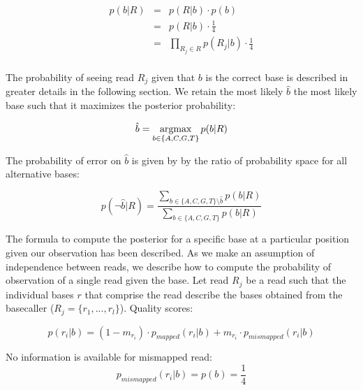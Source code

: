 \documentclass[a4paper,12pt]{article}
\newcommand{\argmax}{\operatornamewithlimits{argmax}}
\begin{document}
\begin{eqnarray}
  p(b|R)   & = & p(R|b) \cdot p(b)  \\
  & = & p(R|b) \cdot \frac {1} {4} \\
  & = & \prod_{R_j \in R} p(R_j|b) \cdot \frac {1} {4} \\
\end{eqnarray} 


\noindent The probability of seeing read $R_j$ given that $b$ is the correct base is described in greater details in the following section.  We retain the most likely $\hat{b}$ the most likely base such that it maximizes the posterior probability:

\begin{equation}
\hat{b} = \argmax_{b \in \{A,C,G,T\} }   p(b|R)
\end{equation} 


\noindent  The probability of error on $\hat{b}$ is given by by the ratio of probability space for all alternative bases:

\begin{equation}
p(\neg \hat{b}|R) = \frac { \sum\limits_{ b \in \{A,C,G,T\}  \setminus \hat{b} } p(b|R) } { \sum\limits_{ b \in \{A,C,G,T\}  } p(b|R) }
\label{errormt}
\end{equation}
 

\noindent The formula to compute the posterior for a specific base at a particular position given our observation has been described. As we make an assumption of independence between reads, we describe how to compute the probability of observation of a single read given the base. Let read $R_j$ be a read such that the individual bases $r$ that comprise the read describe the bases obtained from the basecaller ($R_j = \{ r_1, ..., r_l \}$). Quality scores: \epsilon

\begin{equation}
  p(r_i|b)   =  (1-m_{r_i}) \cdot p_{mapped}(r_i|b) + m_{r_i} \cdot p_{mismapped}(r_i|b) 
\end{equation} 


\noindent No information is available for mismapped read:
\begin{equation}
  p_{mismapped}(r_i|b)   =  p(b) =     \frac{ 1} {4} 
\end{equation} 
\end{document}
